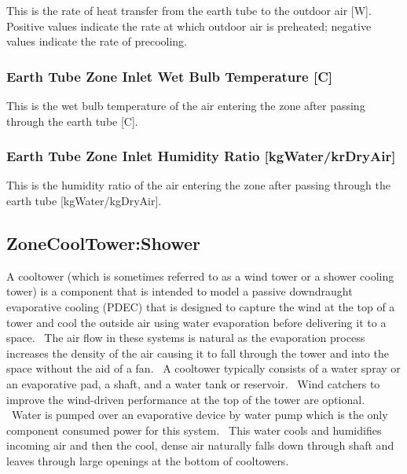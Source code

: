 This is the rate of heat transfer from the earth tube to the outdoor air {[}W{]}.~ Positive values indicate the rate at which outdoor air is preheated; negative values indicate the rate of precooling.

\subsubsection{Earth Tube Zone Inlet Wet Bulb Temperature {[}C{]}}\label{earth-tube-zone-inlet-wet-bulb-temperature-c}

This is the wet bulb temperature of the air entering the zone after passing through the earth tube {[}C{]}.

\subsubsection{Earth Tube Zone Inlet Humidity Ratio {[}kgWater/krDryAir{]}}\label{earth-tube-zone-inlet-humidity-ratio-kgWater/kgDryAir}

This is the humidity ratio of the air entering the zone after passing through the earth tube {[}kgWater/kgDryAir{]}.

\subsection{ZoneCoolTower:Shower}\label{zonecooltowershower}

A cooltower (which is sometimes referred to as a wind tower or a shower cooling tower) is a component that is intended to model a passive downdraught evaporative cooling (PDEC) that is designed to capture the wind at the top of a tower and cool the outside air using water evaporation before delivering it to a space.~ The air flow in these systems is natural as the evaporation process increases the density of the air causing it to fall through the tower and into the space without the aid of a fan. ~A cooltower typically consists of a water spray or an evaporative pad, a shaft, and a water tank or reservoir. ~Wind catchers to improve the wind-driven performance at the top of the tower are optional. ~Water is pumped over an evaporative device by water pump which is the only component consumed power for this system.~ This water cools and humidifies incoming air and then the cool, dense air naturally falls down through shaft and leaves through large openings at the bottom of cooltowers.

